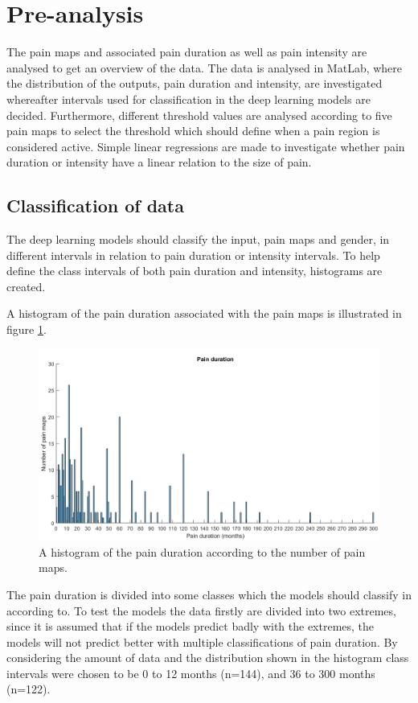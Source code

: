 \section{Pre-analysis}
The pain maps and associated pain duration as well as pain intensity are analysed to get an overview of the data. The data is analysed in MatLab, where the distribution of the outputs, pain duration and intensity, are investigated whereafter intervals used for classification in the deep learning models are decided. Furthermore, different threshold values are analysed according to five pain maps to select the threshold which should define when a pain region is considered active.
Simple linear regressions are made to investigate whether pain duration or intensity have a linear relation to the size of pain.


\subsection{Classification of data}
The deep learning models should classify the input, pain maps and gender, in different intervals in relation to pain duration or intensity intervals. To help define the class intervals of both pain duration and intensity, histograms are created.

\noindent
A histogram of the pain duration associated with the pain maps is illustrated in figure \ref{fig:histoduration}.

\begin{figure} [H]
\centering
\includegraphics[width=1\textwidth]{figures/histogramDuration}
\caption{A histogram of the pain duration according to the number of pain maps.}
\label{fig:histoduration}
\end{figure}

\noindent
The pain duration is divided into some classes which the models should classify in according to. To test the models the data firstly are divided into two extremes, since it is assumed that if the models predict badly with the extremes, the models will not predict better with multiple classifications of pain duration. 
By considering the amount of data and the distribution shown in the histogram class intervals were chosen to be 0 to 12 months (n=144), and 36 to 300 months (n=122). \newline


